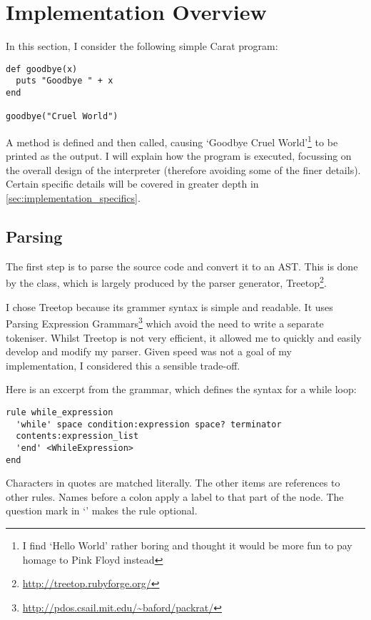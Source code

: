 \section{Implementation Overview}

In this section, I consider the following simple Carat program:

\begin{lstlisting}
def goodbye(x)
  puts "Goodbye " + x
end

goodbye("Cruel World")
\end{lstlisting}

A  method is defined and then called, causing `Goodbye Cruel World'\footnote{I find `Hello World' rather boring and thought it would be more fun to pay homage to Pink Floyd instead} to be printed as the output. I will explain how the program is executed, focussing on the overall design of the interpreter (therefore avoiding some of the finer details). Certain specific details will be covered in greater depth in \autoref{sec:implementation_specifics}.

\subsection{Parsing}

The first step is to parse the source code and convert it to an AST. This is done by the \-\- class, which is largely produced by the parser generator, Treetop\footnote{\url{http://treetop.rubyforge.org/}}.

I chose Treetop because its grammer syntax is simple and readable. It uses Parsing Expression Grammars\footnote{\url{http://pdos.csail.mit.edu/~baford/packrat/}} which avoid the need to write a separate tokeniser. Whilst Treetop is not very efficient, it allowed me to quickly and easily develop and modify my parser. Given speed was not a goal of my implementation, I considered this a sensible trade-off.

Here is an excerpt from the grammar, which defines the syntax for a while loop:

\begin{lstlisting}[language=treetop]
rule while_expression
  'while' space condition:expression space? terminator
  contents:expression_list
  'end' <WhileExpression>
end
\end{lstlisting}

Characters in quotes are matched literally. The other items are references to other rules. Names before a colon apply a label to that part of the node. The question mark in `' makes the rule optional.

